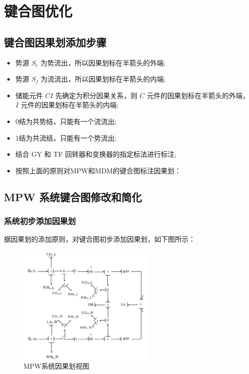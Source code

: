 \clearpage
\section{键合图优化}

\subsection{键合图因果划添加步骤}

\begin{itemize}
	\item 势源 $S_e$ 为势流出，所以因果划标在半箭头的外端;
	\item 势源 $S_f$ 为流流出，所以因果划标在半箭头的内端;
	\item 储能元件 $C I$ 先确定为积分因果关系，则 $C$ 元件的因果划标在半箭头的外端， $I$ 元件的因果划标在半箭头的内端;
	\item 0结为共势结，只能有一个流流出;
	\item 1结为共流结，只能有一个势流出;
	\item 结合 GY 和 TF 回转器和变换器的指定标法进行标注;
	\item 按照上面的原则对MPW和MDM的键合图标注因果划：
\end{itemize}

\subsection{MPW 系统键合图修改和简化}

\subsubsection{系统初步添加因果划}

据因果划的添加原则，对键合图初步添加因果划，如下图所示：
\begin{figure}[H]
	\centering
	\includegraphics[width=0.6\textwidth]{fig/bond/MPW1.png}
	\caption{MPW系统因果划视图 }\label{fig:MPW1}
\end{figure}

